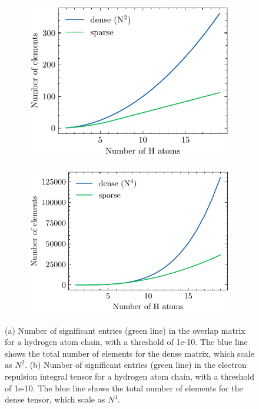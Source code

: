 \begin{figure}[h]
\centering
\begin{subfigure}{0.45\linewidth}
\includegraphics[scale=0.8]{Pics/overlap_nze}
\caption{}
\end{subfigure}
\begin{subfigure}{0.45\linewidth}
\includegraphics[scale=0.8]{Pics/eri_nze}
\caption{}
\end{subfigure}%
\caption[Sparsity of overlap and electron repulsion integrals]{(a) Number of significant entries (green line) in the overlap matrix for a hydrogen atom chain, with a threshold of 1e-10. The blue line shows the total number of elements for the dense matrix, which scale as $N^2$. (b) Number of significant entries (green line) in the electron repulsion integral tensor for a hydrogen atom chain, with a threshold of 1e-10. The blue line shows the total number of elements for the dense tensor, which scale as $N^4$.}
\label{fig:HCHAIN_ERINZE}
\end{figure}

